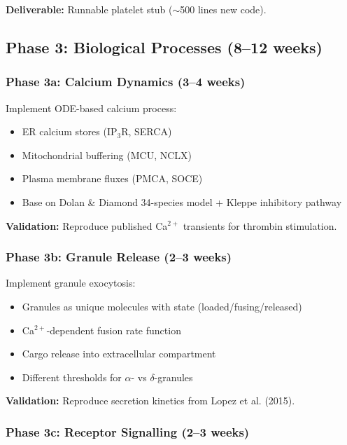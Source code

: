 \documentclass[11pt,a4paper]{report}
\begin{document}
\textbf{Deliverable:} Runnable platelet stub ($\sim$500 lines new code).

\subsection{Phase 3: Biological Processes (8--12 weeks)}

\subsubsection{Phase 3a: Calcium Dynamics (3--4 weeks)}

Implement ODE-based calcium process:

\begin{itemize}
    \item ER calcium stores (IP$_3$R, SERCA)
    \item Mitochondrial buffering (MCU, NCLX)
    \item Plasma membrane fluxes (PMCA, SOCE)
    \item Base on Dolan \& Diamond 34-species model + Kleppe inhibitory pathway
\end{itemize}

\textbf{Validation:} Reproduce published Ca$^{2+}$ transients for thrombin stimulation.

\subsubsection{Phase 3b: Granule Release (2--3 weeks)}

Implement granule exocytosis:

\begin{itemize}
    \item Granules as unique molecules with state (loaded/fusing/released)
    \item Ca$^{2+}$-dependent fusion rate function
    \item Cargo release into extracellular compartment
    \item Different thresholds for $\alpha$- vs $\delta$-granules
\end{itemize}

\textbf{Validation:} Reproduce secretion kinetics from Lopez et al. (2015).

\subsubsection{Phase 3c: Receptor Signalling (2--3 weeks)}
\end{document}

